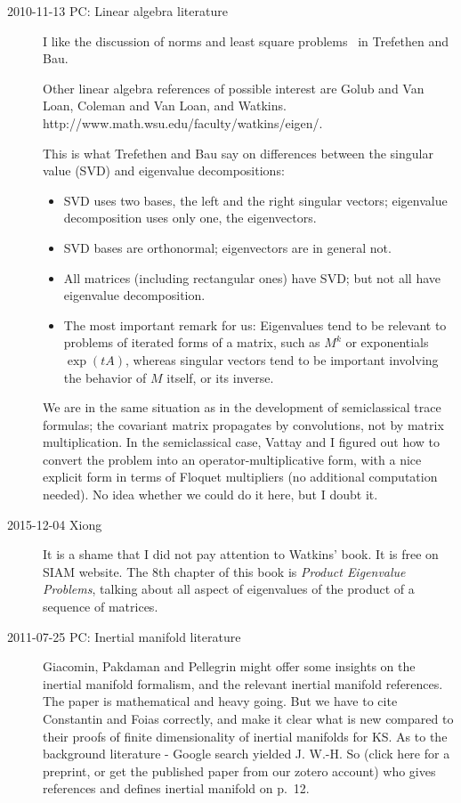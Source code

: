 \begin{description}
\item[2010-11-13 PC: Linear algebra literature]             \inCB
I like the discussion of norms and least square problems \etc\
in Trefethen and Bau.

Other linear algebra references of possible interest are
Golub and Van Loan,
Coleman and Van Loan, and Watkins.
\\
  {http://www.math.wsu.edu/faculty/watkins/eigen/}.

This is what Trefethen and Bau say on differences between
the singular value (SVD) and eigenvalue decompositions:
\begin{itemize}
  \item SVD uses two bases, the left and the right singular vectors;
eigenvalue decomposition uses only one, the eigenvectors.
  \item SVD bases are orthonormal; eigenvectors are in general not.
  \item All matrices (including rectangular ones) have SVD; but not all
have eigenvalue decomposition.
	\item The most important remark for us:                \inCB
Eigenvalues tend to be relevant to
problems of iterated forms of a matrix, such as $M^k$ or exponentials
$\exp(t A)$, whereas singular vectors tend to be important involving
the behavior of $M$ itself, or its inverse.
\end{itemize}

We are in the same situation as in the development of semiclassical trace formulas;
the covariant matrix propagates by convolutions, not by matrix multiplication.
In the semiclassical case, Vattay and I figured out how to convert the
problem into an operator-multiplicative form\rf{Vattay}, with
a nice explicit form in terms of Floquet multipliers (no additional
computation needed). No idea whether we could do it here, but I doubt it.


\item[2015-12-04 Xiong] It is a shame that I did not pay attention
  to Watkins' book\rf{Wat07}. It is free on SIAM website.
  The 8th chapter of this book is \emph{Product Eigenvalue Problems},
  talking about all aspect of eigenvalues of the product of a sequence
  of matrices.

\item[2011-07-25 PC: Inertial manifold literature] Giacomin, Pakdaman and
Pellegrin\rf{GiPaPe11} might offer some insights on the inertial manifold
formalism, and the relevant inertial manifold references. The paper is
mathematical and heavy going. But we have to cite Constantin and Foias
correctly, and make it clear what is new compared to their proofs of
finite dimensionality of inertial manifolds for KS. As to the background
literature - Google search yielded J. W.-H. So\rf{So91} (click
 {here}
for a preprint, or get the published paper from our zotero account) who
gives references and defines inertial manifold on p.~12.


\end{description}
